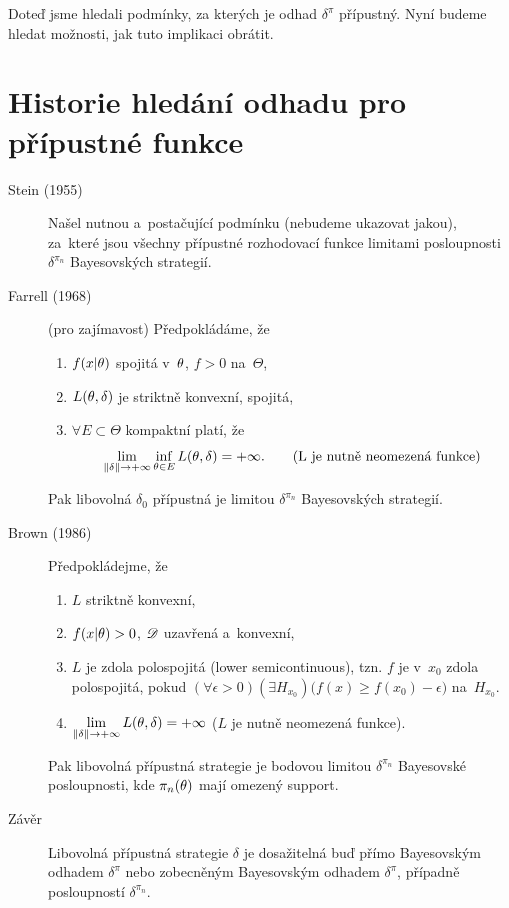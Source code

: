 \begin{remark}
	Doteď jsme hledali podmínky, za kterých je odhad  $\delta^{\pi}$ přípustný. Nyní budeme hledat možnosti, jak tuto implikaci obrátit.
	\section{Historie hledání odhadu pro přípustné funkce}
	\begin{description}
		\item[Stein (1955)] Našel nutnou a~postačující podmínku (nebudeme ukazovat jakou), za~které jsou všechny přípustné rozhodovací funkce limitami posloupnosti $\delta^{\pi_n}$ Bayesovských strategií.
		\item[Farrell (1968)] (pro zajímavost) Předpokládáme, že \begin{enumerate}[1)]
			\item $f(x|\theta)$ spojitá v~$\theta$, $f>0$ na~$\Theta$,
			\item $L(\theta,\delta)$ je striktně konvexní, spojitá,
			\item $\forall E\subset\Theta$ kompaktní platí, že 
			$$ \lim\limits_{\left\|\delta\right\|\to+\infty}\inf\limits_{\theta\in E}L(\theta,\delta)=+\infty.\qquad(\text{L je nutně neomezená funkce})$$ 
		\end{enumerate}
	Pak libovolná $\delta_0$ přípustná je limitou $\delta^{\pi_n}$ Bayesovských strategií.
	\item[Brown (1986)] Předpokládejme, že \begin{enumerate}[1)]
		\item $L$ striktně konvexní,
		\item $f(x|\theta)>0$, $\mathscr{D} $ uzavřená a~konvexní,
		\item $L$ je zdola polospojitá (lower semicontinuous), tzn. $f$ je v~$x_0$ zdola polospojitá, pokud $(\forall\epsilon>0)(\exists H_{x_0})\big(f(x)\geq f(x_0)-\epsilon\big)$ na~$H_{x_0}$.
		\item $\lim\limits_{\left\|\delta\right\|\to+\infty} L(\theta,\delta)=+\infty$ \hspace{0.2cm} ($L$ je nutně neomezená funkce).
	\end{enumerate}
Pak libovolná přípustná strategie je bodovou limitou $\delta^{\pi_n}$ Bayesovské posloupnosti, kde $\pi_n(\theta)$ mají omezený support.
\item[Závěr] Libovolná přípustná strategie $\delta$ je dosažitelná buď přímo Bayesovským odhadem $\delta^\pi$ nebo zobecněným Bayesovským odhadem $\delta^\pi$, případně posloupností $\delta^{\pi_n}$.
	\end{description}
\end{remark}

